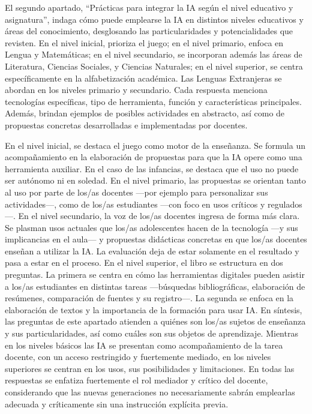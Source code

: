 \documentclass[spanish]{textolivre}
\begin{document}
El segundo apartado, “Prácticas para integrar la IA según el nivel educativo y asignatura”, indaga cómo puede emplearse la IA en distintos niveles educativos y áreas del conocimiento, desglosando las particularidades y potencialidades que revisten. En el nivel inicial, prioriza el juego; en el nivel primario, enfoca en Lengua y Matemáticas; en el nivel secundario, se incorporan además las áreas de Literatura, Ciencias Sociales, y Ciencias Naturales; en el nivel superior, se centra específicamente en la alfabetización académica. Las Lenguas Extranjeras se abordan en los niveles primario y secundario. Cada respuesta menciona tecnologías específicas, tipo de herramienta, función y características principales. Además, brindan ejemplos de posibles actividades en abstracto, así como de propuestas concretas desarrolladas e implementadas por docentes.

En el nivel inicial, se destaca el juego como motor de la enseñanza. Se formula un acompañamiento en la elaboración de propuestas para que la IA opere como una herramienta auxiliar. En el caso de las infancias, se destaca que el uso no puede ser autónomo ni en soledad. En el nivel primario, las propuestas se orientan tanto al uso por parte de los/as docentes —por ejemplo para personalizar sus actividades—, como de los/as estudiantes —con foco en usos críticos y regulados—. En el nivel secundario, la voz de los/as docentes ingresa de forma más clara. Se plasman usos actuales que los/as adolescentes hacen de la tecnología —y sus implicancias en el aula— y propuestas didácticas concretas en que los/as docentes enseñan a utilizar la IA. La evaluación deja de estar solamente en el resultado y pasa a estar en el proceso. En el nivel superior, el libro se estructura en dos preguntas. La primera se centra en cómo las herramientas digitales pueden asistir a los/as estudiantes en distintas tareas —búsquedas bibliográficas, elaboración de resúmenes, comparación de fuentes y su registro—. La segunda se enfoca en la elaboración de textos y la importancia de la formación para usar IA. En síntesis, las preguntas de este apartado atienden a quiénes son los/as sujetos de enseñanza y sus particularidades, así como cuáles son sus objetos de aprendizaje. Mientras en los niveles básicos las IA se presentan como acompañamiento de la tarea docente, con un acceso restringido y fuertemente mediado, en los niveles superiores se centran en los usos, sus posibilidades y limitaciones. En todas las respuestas se enfatiza fuertemente el rol mediador y crítico del docente, considerando que las nuevas generaciones no necesariamente sabrán emplearlas adecuada y críticamente sin una instrucción explícita previa.
\end{document}
